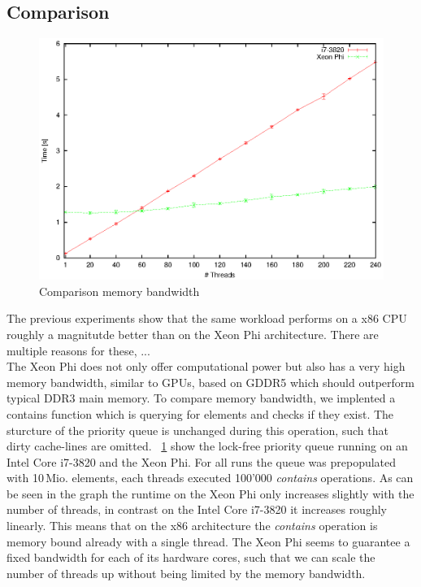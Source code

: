 \subsection{Comparison}
\begin{figure}[t]
	\centering
	\includegraphics[width=0.9\columnwidth]{../plots/comp_contains/runtime_contains}
	\caption{Comparison memory bandwidth}
	\label{fig:comp_contains}
\end{figure}
The previous experiments show that the same workload performs on a x86 CPU roughly a magnitutde better than on the Xeon Phi architecture. There are multiple reasons for these, ...\\ %
The Xeon Phi does not only offer computational power but also has a very high memory bandwidth, similar to GPUs, based on GDDR5 which should outperform typical DDR3 main memory. To compare memory bandwidth, we implented a contains function which is querying for elements and checks if they exist. The sturcture of the priority queue is unchanged during this operation, such that dirty cache-lines are omitted. \figurename~\ref{fig:comp_contains} show the lock-free priority queue running on an Intel Core i7-3820 and the Xeon Phi. For all runs the queue was prepopulated with 10\,Mio. elements, each threads executed 100'000 \textit{contains} operations. As can be seen in the graph the runtime on the Xeon Phi only increases slightly with the number of threads, in contrast on the Intel Core i7-3820 it increases roughly linearly. This means that on the x86 architecture the \textit{contains} operation is memory bound already with a single thread. The Xeon Phi seems to guarantee a fixed bandwidth for each of its hardware cores, such that we can scale the number of threads up without being limited by the memory bandwidth.\\

